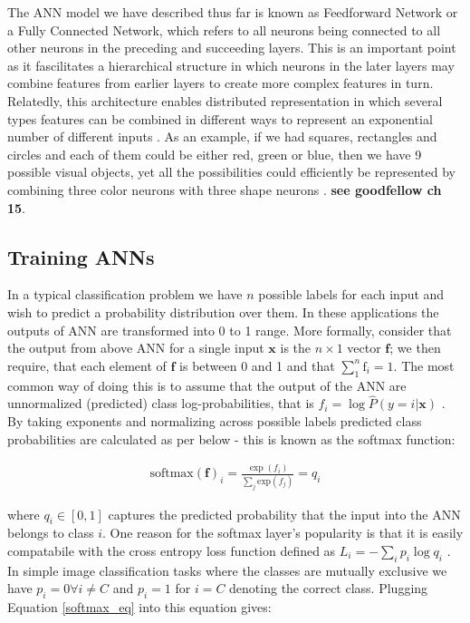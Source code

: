 \documentclass[12pt]{report}
\begin{document}
The ANN model we have described thus far is known as Feedforward Network or a Fully Connected Network, which refers to all neurons being connected to all other neurons in the preceding and succeeding layers. This is an important point as it fascilitates a hierarchical structure in which neurons in the later layers may combine features from earlier layers to create more complex features in turn. Relatedly, this architecture enables distributed representation in which several types features can be combined in different ways to represent an exponential number of different inputs \cite{Hinton1985}. As an example, if we had squares, rectangles and circles and each of them could be either red, green or blue, then we have 9 possible visual objects, yet all the possibilities could efficiently be represented by combining three color neurons with three shape neurons \cite{Goodfellow2016}. \textbf{see goodfellow ch 15}.

\subsection{Training ANNs}

In a typical classification problem we have $n$ possible labels for each input and wish to predict a probability distribution over them. In these applications the outputs of ANN are transformed into 0 to 1 range. More formally, consider that the output from above ANN for a single input $\mathbf{x}$ is the $n \times 1$ vector $\mathbf{f}$; we then require, that each element of $\mathbf{f}$ is between 0 and 1 and that $\sum_1^n \text{f}_i = 1$. The most common way of doing this is to assume that the output of the ANN are unnormalized (predicted) class log-probabilities, that is $f_i = \log \hat{P}(y = i | \mathbf{x})$ \cite{Goodfellow2016}. By taking exponents and normalizing across possible labels predicted class probabilities are calculated as per below - this is known as the softmax function:

\begin{align} \label{softmax_eq}
  \text{softmax}(\mathbf{f})_i = \frac{\exp (f_i)}{\sum_j \text{exp}(f_j)}=q_i
\end{align}

where $q_i \in [0,1]$ captures the predicted probability that the input into the ANN belongs to class $i$. One reason for the softmax layer's popularity is that it is easily compatabile with the cross entropy loss function defined as $L_i=-\sum_i p_i \log q_i$ \cite{Shannon1948}. In simple image classification tasks where the classes are mutually exclusive we have $p_i=0 \forall i\ne C$ and $p_i=1$ for $i=C$ denoting the correct class. Plugging Equation \ref{softmax_eq} into this equation gives:
\end{document}
